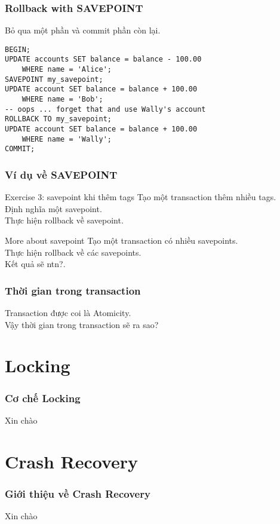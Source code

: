 \documentclass[xcolor={table, dvipsnames}]{beamer}
\begin{document}
\begin{frame}[fragile]
\frametitle{Rollback with SAVEPOINT}
Bỏ qua một phần và commit phần còn lại.\\
\pause
\begin{verbatim}
BEGIN;
UPDATE accounts SET balance = balance - 100.00
	WHERE name = 'Alice';
SAVEPOINT my_savepoint;
UPDATE account SET balance = balance + 100.00
	WHERE name = 'Bob';
-- oops ... forget that and use Wally's account
ROLLBACK TO my_savepoint;
UPDATE account SET balance = balance + 100.00
	WHERE name = 'Wally';
COMMIT;
\end{verbatim}
\end{frame}
\begin{frame}
\frametitle{Ví dụ về SAVEPOINT}
\begin{block}{Exercise 3: savepoint khi thêm tags}
Tạo một transaction thêm nhiều tags.\\
Định nghĩa một savepoint.\\
Thực hiện rollback về savepoint.\\
\end{block}
\pause
\begin{block}{More about savepoint}
Tạo một transaction có nhiều savepoints.\\
Thực hiện rollback về các savepoints.\\
Kết quả sẽ ntn?.
\end{block}
\end{frame}

\begin{frame}
\frametitle{Thời gian trong transaction}
Transaction được coi là Atomicity.\\
Vậy thời gian trong transaction sẽ ra sao?\\
\end{frame}


\section{Locking}

\begin{frame}
\frametitle{Cơ chế Locking}

Xin chào

\end{frame}

\section{Crash Recovery}

\begin{frame}
\frametitle{Giới thiệu về Crash Recovery}

Xin chào

\end{frame}
\end{document}

